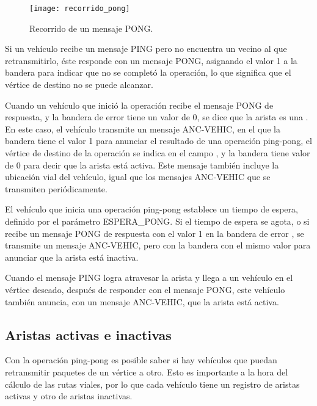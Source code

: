 \begin{figure}[th!]
\centering
\texttt{[image: recorrido\_pong]}
\decoRule
\caption[Recorrido de un mensaje PONG]{Recorrido de un mensaje PONG.}
\label{fig:recorrido_pong}
\end{figure}

Si un vehículo recibe un mensaje PING pero no encuentra un vecino al que
retransmitirlo, éste responde con un mensaje PONG, asignando el valor 1 a la
bandera  para indicar que no se completó la operación, lo que
significa que el vértice de destino no se puede alcanzar.

Cuando un vehículo que inició la operación recibe el mensaje PONG de respuesta,
y la bandera de error  tiene un valor de 0, se dice que la arista es
una . En este caso, el vehículo transmite un mensaje
ANC-VEHIC, en el que la bandera  tiene el valor 1 para anunciar el
resultado de una operación ping-pong, el vértice de destino de la operación se
indica en el campo , y la bandera  tiene
valor de 0 para decir que la arista está activa. Este mensaje también incluye
la ubicación vial del vehículo, igual que los mensajes ANC-VEHIC que se
transmiten periódicamente.

El vehículo que inicia una operación ping-pong establece un tiempo de espera,
definido por el parámetro ESPERA\_PONG. Si el tiempo de espera se agota, o si
recibe un mensaje PONG de respuesta con el valor 1 en la bandera de error
, se transmite un mensaje ANC-VEHIC, pero con la bandera 
con el mismo valor para anunciar que la arista está inactiva.

Cuando el mensaje PING logra atravesar la arista y llega a un vehículo en el
vértice deseado, después de responder con el mensaje PONG, este vehículo
también anuncia, con un mensaje ANC-VEHIC, que la arista está activa.

\subsection{Aristas activas e inactivas}

\label{subsec:aristas_activas_e_inactivas}

Con la operación ping-pong es posible saber si hay vehículos que puedan
retransmitir paquetes de un vértice a otro. Esto es importante a la hora del
cálculo de las rutas viales, por lo que cada vehículo tiene un registro de
aristas activas y otro de aristas inactivas.


